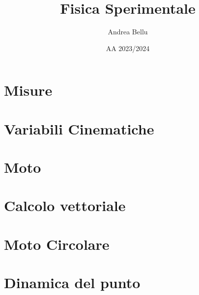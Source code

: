 \documentclass{article}
\title{Fisica Sperimentale}
\author{Andrea Bellu}
\date{AA 2023/2024}
\begin{document}
\maketitle

\tableofcontents
\newpage

\section{Misure}

\section{Variabili Cinematiche}

\section{Moto}


\section{Calcolo vettoriale}


\section{Moto Circolare}


\section{Dinamica del punto}

\end{document}
